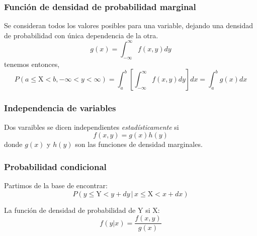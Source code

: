 \documentclass[openany]{book}
\begin{document}
\subsubsection*{Función de densidad de probabilidad marginal}
Se consideran todos los valores posibles para una variable, dejando una densidad de probabilidad con única dependencia de la otra.
\begin{equation}
  \label{eq:marginal}
  g(x)=\int_{-\infty}^{\infty}f(x,y)dy
\end{equation}
tenemos entonces,
\begin{equation}
  P(a\leq\mathrm{X}<b,-\infty<y<\infty)=\int_{a}^{b}\left[\int_{-\infty}^{\infty}f(x,y)dy\right]dx=\int_{a}^{b}g(x)dx
\end{equation}

\subsubsection*{Independencia de variables}
Dos varaibles se dicen independientes \emph{estadísticamente} si
\begin{equation}
  \label{eq:independent}
  f(x,y)=g(x)h(y)
\end{equation}
donde $g(x)$ y $h(y)$ son las funciones de densidad marginales.

\subsubsection*{Probabilidad condicional}
Partimos de la base de encontrar:
\begin{equation*}
  P(y\leq\mathrm{Y}<y+dy\,|\,x\leq\mathrm{X}<x+dx)
\end{equation*}

La función de densidad de probabilidad de Y si X:
\begin{equation}
  \label{eq:densidad-condicional}
  f(y|x)=\frac{f(x,y)}{g(x)}
\end{equation}
\end{document}
